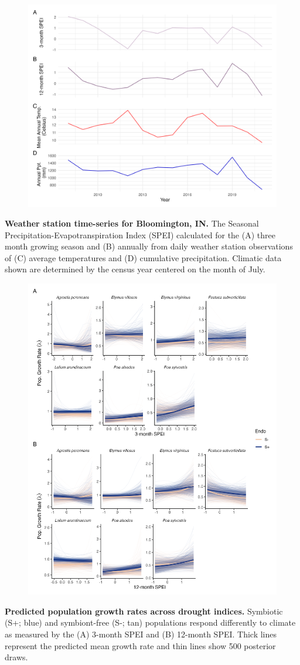 \documentclass[12pt]{article}
\begin{document}
\begin{figure}
	\centering
	\includegraphics[width=\linewidth]{climate_plot.png}
\end{figure}
 \textbf{Weather station time-series for Bloomington, IN.} The Seasonal Precipitation-Evapotranspiration Index (SPEI) calculated for the (A) three month growing season and (B) annually from daily weather station observations of (C) average temperatures and (D) cumulative precipitation. Climatic data shown are determined by the census year centered on the month of July. %
\newpage

\begin{figure}
	\centering
	\includegraphics[width=.7\linewidth]{spei_combo_lambda_plot.png}
\end{figure}
 \textbf{Predicted population growth rates across drought indices.} Symbiotic (S+; blue) and symbiont-free (S-; tan) populations respond differently to climate as measured by the (A) 3-month SPEI and (B) 12-month SPEI. Thick lines represent the predicted mean growth rate and thin lines show 500 posterior draws.
\newpage
\end{document}
